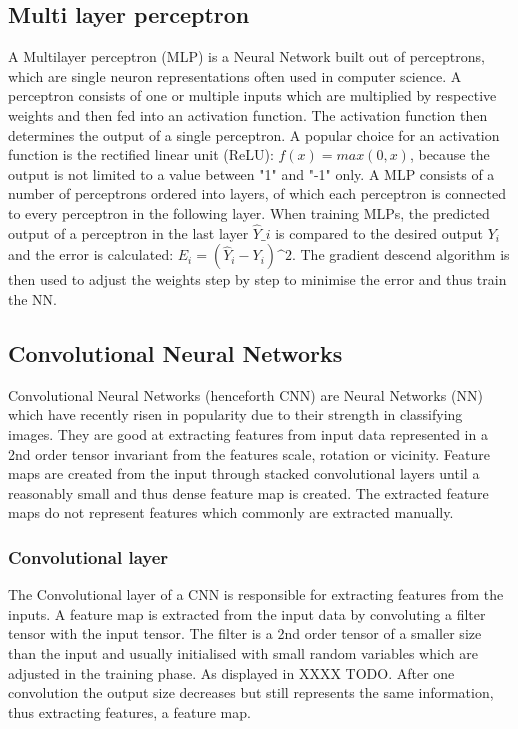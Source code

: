 \documentclass[journal]{IEEEtran}
\begin{document}
\subsection{Multi layer perceptron}
\label{sc:mlp}
A Multilayer perceptron (MLP) is a Neural Network built out of perceptrons, which are single neuron representations often used in computer science. A perceptron consists of one or multiple inputs which are multiplied by respective weights and then fed into an activation function. The activation function then determines the output of a single perceptron. A popular choice for an activation function is the rectified linear unit (ReLU): $ f(x)=max(0, x) $, because the output is not limited to a value between "1" and "-1" only. A MLP consists of a number of perceptrons ordered into layers, of which each perceptron is connected to every perceptron in the following layer. When training MLPs, the predicted output of a perceptron in the last layer $ \hat{Y}\_i $ is compared to the desired output $ Y_i $ and the error is calculated: $ E_i = (\hat{Y}_i - Y_i)\^{2} $. The gradient descend algorithm is then used to adjust the weights step by step to minimise the error and thus train the NN. 

\subsection{Convolutional Neural Networks}
Convolutional Neural Networks (henceforth CNN) are Neural Networks (NN) which have recently risen in popularity due to their strength in classifying images. They are good at extracting features from input data represented in a 2nd order tensor invariant from the features scale, rotation or vicinity. Feature maps are created from the input through stacked convolutional layers until a reasonably small and thus dense feature map is created. The extracted feature maps do not represent features which commonly are extracted manually. 

\subsubsection{Convolutional layer}
The Convolutional layer of a CNN is responsible for extracting features from the inputs. A feature map is extracted from the input data by convoluting a filter tensor with the input tensor. The filter is a 2nd order tensor of a smaller size than the input and usually initialised with small random variables which are adjusted in the training phase. As displayed in XXXX TODO. After one convolution the output size decreases but still represents the same information, thus extracting features, a feature map.  
\end{document}
